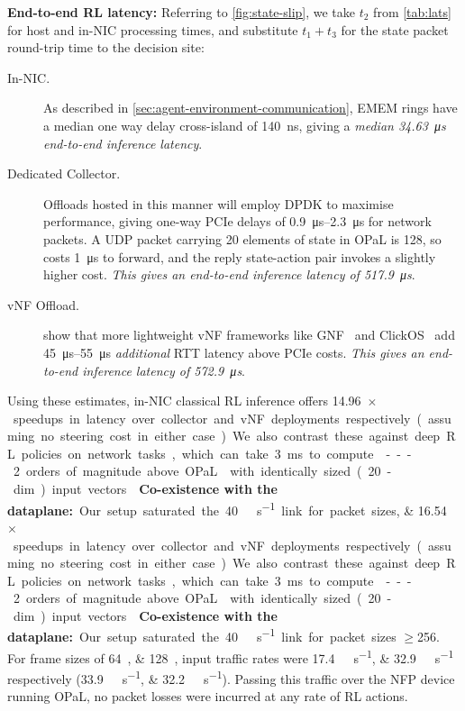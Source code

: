 \documentclass[
sigconf,natbib=false
]{acmart}
\newcommand{\fakepara}[1]{\noindent\textbf{#1:}}
\newcommand{\approachshort}{OPaL}
\begin{document}
\fakepara{End-to-end RL latency}
Referring to \cref{fig:state-slip}, we take $t_2$ from \cref{tab:lats} for host and in-NIC processing times, and substitute $t_1+t_3$ for the state packet round-trip time to the decision site:
\begin{description}
	\item[In-NIC.] As described in \cref{sec:agent-environment-communication}, EMEM rings have a median one way delay cross-island of \SI{140}{\nano\second}, giving a \emph{median \SI{34.63}{\micro\second} end-to-end inference latency}.
	\item[Dedicated Collector.] Offloads hosted in this manner will employ DPDK to maximise performance, giving one-way PCIe delays of \SIrange{0.9}{2.3}{\micro\second} for network packets.
	A UDP packet carrying \num{20} elements of state in \approachshort{} is \SI{128}{\byte}, so costs \SI{1}{\micro\second} to forward, and the reply state-action pair invokes a slightly higher cost.
	\emph{This gives an end-to-end inference latency of \SI{517.9}{\micro\second}}.
	\item[vNF Offload.] \Textcite{DBLP:journals/cm/CzivaP17} show that more lightweight vNF frameworks like GNF~\parencite{DBLP:journals/cm/CzivaP17} and ClickOS~\parencite{DBLP:conf/nsdi/MartinsAROHBH14} add \SIrange{45}{55}{\micro\second} \emph{additional} RTT latency above PCIe costs.
	\emph{This gives an end-to-end inference latency of \SI{572.9}{\micro\second}}.
\end{description}
Using these estimates, in-NIC classical RL inference offers \SIlist{14.96;16.54}{$\times$} speedups in latency over collector and vNF deployments respectively (assuming no steering cost in either case).
We also contrast these against deep RL policies on network tasks, which can take \SI{3}{\milli\second} to compute~\parencite{DBLP:journals/corr/abs-1910-04054}---2 orders of magnitude above \approachshort{} with identically sized (20-dim) input vectors.

\fakepara{Co-existence with the dataplane}
Our setup saturated the \SI{40}{\giga\bit\per\second} link for packet sizes $\ge$\SI{256}{\byte}.
For frame sizes of \SIlist{64;128}{\byte}, input traffic rates were \SIlist{17.4;32.9}{\giga\bit\per\second} respectively (\SIlist[per-symbol=p,sticky-per=true]{33.9;32.2}{\mega\packet\per\second}).
Passing this traffic over the NFP device running \approachshort, no packet losses were incurred at any rate of RL actions.
\end{document}

